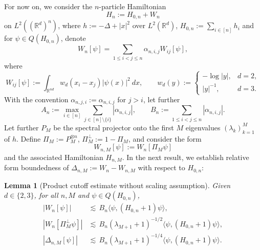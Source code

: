 \documentclass[11pt]{amsart}
\newcommand{\1}{\mathbbm{1}}
\newcommand{\R}{\mathbb{R}}
\theoremstyle{plain}
\newtheorem{lemma}[theorem]{Lemma}
\theoremstyle{definition}
\theoremstyle{remark}
\numberwithin{equation}{section}
\begin{document}
\noindent For now on, we consider the $n$-particle Hamiltonian
\[
H_n:=H_{0,n}+W_n
\]
on \(L^2((\R^d)^n)\), where $h:=-\Delta+|x|^2$ over $L^2(\mathbb{R}^d)$, $H_{0,n}:=\sum_{i\in[n]}h_i$ and for $\psi\in Q(H_{0,n})$, denote
\[
W_n[\psi]=\sum_{1\le i<j\le n}\alpha_{n,i,j}W_{ij}[\psi],
\]
where
\[
W_{ij}[\psi]:=\int_{\R^{nd}}w_d(x_i-x_j)|\psi(x)|^2 \ dx,\qquad
w_d(y):=
\begin{cases}
-\log|y|, & d=2,\\[0.3em]
|y|^{-1}, & d=3.
\end{cases}
\]
With the convention \(\alpha_{n,j,i}:=\alpha_{n,i,j}\) for \(j>i\), let further
\[
A_n:=\max_{i\in[n]}\sum_{j\in[n]\setminus\{i\}}|\alpha_{n,i,j}|,
\qquad
B_n:=\sum_{1\le i<j\le n}|\alpha_{n,i,j}|.
\]
Let further $P_M$ be the spectral projector onto the first $M$ eigenvalues \((\lambda_k)_{k=1}^M\) of \(h\). Define \(\Pi_M:=P_M^{\otimes n}\), \(\Pi_M^\perp:=1-\Pi_M\), and consider the form
\[W_{n,M}[\psi]:=W_n[\Pi_M\psi]\]
and the associated Hamiltonian $H_{n,M}$. In the next result, we establish relative form boundedness of $\Delta_{n,M}:=W_n-W_{n,M}$ with respect to $H_{0,n}$:

\begin{lemma}[Product cutoff estimate without scaling assumption]
\label{lem:product-cutoff-riesz-no-scaling}
Given $d\in\{2,3\}$, for all \(n,M\) and \(\psi\in Q(H_{0,n})\),
\begin{align}
|W_n[\psi]|&\lesssim \,B_n\langle\psi,(H_{0,n}+1)\psi\rangle,\label{eq111}\\
|W_n[\Pi_M^\perp\psi]|&\lesssim\,B_n(\lambda_{M+1}+1)^{-1/2}\langle\psi,(H_{0,n}+1)\psi\rangle,\label{eq222}\\
|\Delta_{n,M}[\psi]|&\lesssim\,B_n(\lambda_{M+1}+1)^{-1/4}\langle\psi,(H_{0,n}+1)\psi\rangle.\label{eq333}
\end{align}
\end{lemma}
\end{document}
